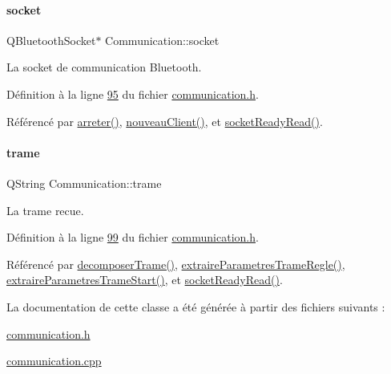 \paragraph{\texorpdfstring{socket}{socket}}
{\footnotesize\ttfamily Q\+Bluetooth\+Socket$\ast$ Communication\+::socket\hspace{0.3cm}{\ttfamily [private]}}



La socket de communication Bluetooth. 



Définition à la ligne \hyperlink{communication_8h_source_l00095}{95} du fichier \hyperlink{communication_8h_source}{communication.\+h}.



Référencé par \hyperlink{communication_8cpp_source_l00121}{arreter()}, \hyperlink{communication_8cpp_source_l00150}{nouveau\+Client()}, et \hyperlink{communication_8cpp_source_l00166}{socket\+Ready\+Read()}.

\mbox{\label{class_communication_ac8f5004bfaaf7f538ba5ae93255f772b}} 
\paragraph{\texorpdfstring{trame}{trame}}
{\footnotesize\ttfamily Q\+String Communication\+::trame\hspace{0.3cm}{\ttfamily [private]}}



La trame recue. 



Définition à la ligne \hyperlink{communication_8h_source_l00099}{99} du fichier \hyperlink{communication_8h_source}{communication.\+h}.



Référencé par \hyperlink{communication_8cpp_source_l00188}{decomposer\+Trame()}, \hyperlink{communication_8cpp_source_l00279}{extraire\+Parametres\+Trame\+Regle()}, \hyperlink{communication_8cpp_source_l00243}{extraire\+Parametres\+Trame\+Start()}, et \hyperlink{communication_8cpp_source_l00166}{socket\+Ready\+Read()}.



La documentation de cette classe a été générée à partir des fichiers suivants \+:\begin{DoxyCompactItemize}
\item 
\hyperlink{communication_8h}{communication.\+h}\item 
\hyperlink{communication_8cpp}{communication.\+cpp}\end{DoxyCompactItemize}
